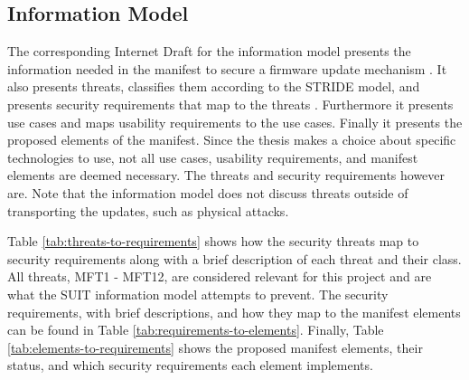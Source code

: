 \documentclass[0-thesis.tex]{subfiles}
\begin{document}

\subsection{Information Model}
\label{ssec:information-model}
The corresponding Internet Draft for the information model presents the information needed
in the manifest to secure a firmware update mechanism \parencite{suit-information-model}.
It also presents threats, classifies them according to the STRIDE model, and presents
security requirements that map to the threats \parencite{stride}. Furthermore it presents
use cases and maps usability requirements to the use cases. Finally it presents the
proposed elements of the manifest. Since the thesis makes a choice about specific
technologies to use, not all use cases, usability requirements, and manifest elements are
deemed necessary. The threats and security requirements however are. Note that the
information model does not discuss threats outside of transporting the updates, such as
physical attacks.

Table \ref{tab:threats-to-requirements} shows how the security threats map to security
requirements along with a brief description of each threat and their class. All threats,
MFT1 - MFT12, are considered relevant for this project and are what the SUIT information
model attempts to prevent. The security requirements, with brief descriptions, and how
they map to the manifest elements can be found in Table
\ref{tab:requirements-to-elements}. Finally, Table \ref{tab:elements-to-requirements}
shows the proposed manifest elements, their status, and which security requirements each
element implements.
\end{document}
